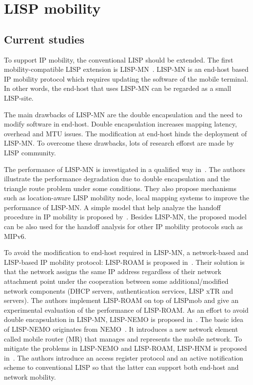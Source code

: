 \section{LISP mobility}
\label{sec:mobility}

\subsection{Current studies}
\label{subsec:mobility_studies}
To support IP mobility, the conventional LISP should be extended. The first mobility-compatible LISP extension is LISP-MN~\cite{mn00}\cite{natal2013lisp}. LISP-MN is an end-host based IP mobility protocol which requires updating the software of the mobile terminal. In other words, the end-host that uses LISP-MN can be regarded as a small LISP-site.

The main drawbacks of LISP-MN are the double encapsulation and the need to modify software in end-host. Double encapsulation increases mapping latency, overhead and MTU issues. The modification at end-host hinds the deployment of LISP-MN. To overcome these drawbacks, lots of research efforst are made by LISP community.

The performance of LISP-MN is investigated in a qualified way in~\cite{menth2010improvements}. The authors illustrate the performance degradation due to double encapsulation and the triangle route problem under some conditions. They also propose mechanisms such as location-aware LISP mobility node, local mapping systems to improve the performance of LISP-MN. A simple model that help analyze the handoff procedure in IP mobility is proposed by~\cite{phoomikiattisak2016control}. Besides LISP-MN, the proposed model can be also used for the handoff analysis for other IP mobility protocols such as MIPv6. 

To avoid the modification to end-host required in LISP-MN, a network-based and LISP-based IP mobility protocol: LISP-ROAM is proposed in~\cite{galvani2014lisp}. Their solution is that the network assigns the same IP address regardless of their network attachment point under the cooperation between some additional/modified network components (DHCP servers, authentication services, LISP xTR and servers). The authors implement LISP-ROAM on top of LISPmob and give an experimental evaluation of the performance of LISP-ROAM. As an effort to avoid double encapsulation in LISP-MN, LISP-NEMO is proposed in~\cite{wu2014nemo}. The basic idea of LISP-NEMO originates from NEMO~\cite{jeon2010network}. It introduces a new network element called mobile router (MR) that manages and represents the mobile network. To mitigate the problems in LISP-NEMO and LISP-ROAM, LISP-HNM is proposed in~\cite{tang2017lisp}. The authors introduce an access register protocol and an active
notification scheme to conventional LISP so that the latter can support both end-host and network mobility.

